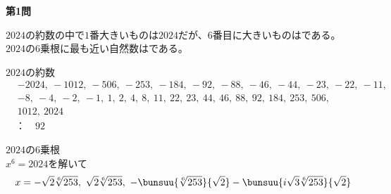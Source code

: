 \documentclass[14pt,b5paper,dvipdfmx,fleqn]{jarticle}
\begin{document}
    \begin{framed}
        \noindent
        {\bf \large 第1問 \quad \kakkoichi} \par
        $2024$の約数の中で$1$番大きいものは$2024$だが、$6$番目に大きいものはである。
        $2024$の$6$乗根に最も近い自然数はである。
    \end{framed}

    \noindent
    \setumei\quad $2024$の約数
    \begin{align*}
        &-2024,~-1012,~-506,~-253,~-184,~-92,~-88,~-46,~-44,~-23,~-22,~-11, \\
        &-8,~-4,~-2,~-1,~1,~2,~4,~8,~11,~22,~23,~44,~46,~88,~92,~184,~253,~506, \\
        &1012,~2024
    \end{align*}
    ~~：~~$92$

    \noindent
    $2024$の$6$乗根 \\[1mm]
    $x^6=2024$を解いて
    \begin{align*}
        x=-\sqrt{2}\sqrt[6]{253},~\sqrt{2}\sqrt[6]{253},~-\bunsuu{\sqrt[6]{253}}{\sqrt{2}}-\bunsuu{i\sqrt{3}\sqrt[6]{253}}{\sqrt{2}}
    \end{align*}
\end{document}
